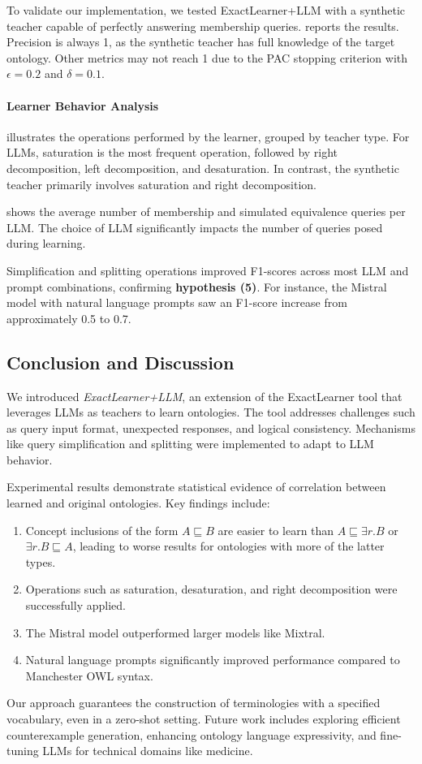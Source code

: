 %
To validate our implementation, we tested ExactLearner+LLM with a synthetic teacher capable of perfectly answering membership queries.
%
 reports the results.
%
Precision is always 1, as the synthetic teacher has full knowledge of the target ontology.
%
Other metrics may not reach 1 due to the PAC stopping criterion with \(\epsilon = 0.2\) and \(\delta = 0.1\).

%
\paragraph{Learner Behavior Analysis}
\label{par:learner-behavior-analysis}
%
 illustrates the operations performed by the learner, grouped by teacher type.
%
For \glspl{LLM}, saturation is the most frequent operation, followed by right decomposition, left decomposition, and desaturation.
%
In contrast, the synthetic teacher primarily involves saturation and right decomposition.

%
 shows the average number of membership and simulated equivalence queries per \gls{LLM}.
%
The choice of \gls{LLM} significantly impacts the number of queries posed during learning.

%
Simplification and splitting operations improved F1-scores across most \gls{LLM} and prompt combinations, confirming \textbf{hypothesis (5)}.
%
For instance, the Mistral model with natural language prompts saw an F1-score increase from approximately 0.5 to 0.7.

%
\subsection{Conclusion and Discussion}
\label{subsec:actively-learning-conclusion}
%
We introduced \emph{ExactLearner+LLM}, an extension of the ExactLearner tool that leverages \glspl{LLM} as teachers to learn \EL ontologies.
%
The tool addresses challenges such as query input format, unexpected responses, and logical consistency.
%
Mechanisms like query simplification and splitting were implemented to adapt to \gls{LLM} behavior.

%
Experimental results demonstrate statistical evidence of correlation between learned and original ontologies.
%
Key findings include:
%
\begin{enumerate}
    \item Concept inclusions of the form \(A \sqsubseteq B\) are easier to learn than \(A \sqsubseteq \exists r.B\) or \(\exists r.B \sqsubseteq A\), leading to worse results for ontologies with more of the latter types.
    \item Operations such as saturation, desaturation, and right decomposition were successfully applied.
    \item The Mistral model outperformed larger models like Mixtral.
    \item Natural language prompts significantly improved performance compared to Manchester OWL syntax.
\end{enumerate}

%
Our approach guarantees the construction of \EL terminologies with a specified vocabulary, even in a zero-shot setting.
%
Future work includes exploring efficient counterexample generation, enhancing ontology language expressivity, and fine-tuning \glspl{LLM} for technical domains like medicine.